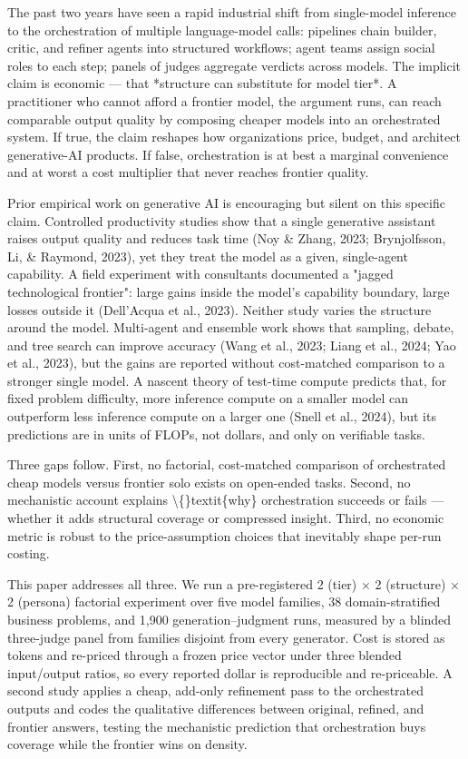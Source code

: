 \documentclass[11pt,a4paper]{article}
\begin{document}
The past two years have seen a rapid industrial shift from single-model
inference to the orchestration of multiple language-model calls: pipelines
chain builder, critic, and refiner agents into structured workflows; agent
teams assign social roles to each step; panels of judges aggregate verdicts
across models. The implicit claim is economic — that *structure can
substitute for model tier*. A practitioner who cannot afford a frontier
model, the argument runs, can reach comparable output quality by composing
cheaper models into an orchestrated system. If true, the claim reshapes how
organizations price, budget, and architect generative-AI products. If
false, orchestration is at best a marginal convenience and at worst a cost
multiplier that never reaches frontier quality.

Prior empirical work on generative AI is encouraging but silent on this
specific claim. Controlled productivity studies show that a single generative
assistant raises output quality and reduces task time (Noy \& Zhang, 2023;
Brynjolfsson, Li, \& Raymond, 2023), yet they treat the model as a given,
single-agent capability. A field experiment with consultants documented a
"jagged technological frontier": large gains inside the model's capability
boundary, large losses outside it (Dell'Acqua et al., 2023). Neither study
varies the structure around the model. Multi-agent and ensemble work shows
that sampling, debate, and tree search can improve accuracy (Wang et al.,
2023; Liang et al., 2024; Yao et al., 2023), but the gains are reported
without cost-matched comparison to a stronger single model. A nascent
theory of test-time compute predicts that, for fixed problem difficulty,
more inference compute on a smaller model can outperform less inference
compute on a larger one (Snell et al., 2024), but its predictions are in
units of FLOPs, not dollars, and only on verifiable tasks.

Three gaps follow. First, no factorial, cost-matched comparison of
orchestrated cheap models versus frontier solo exists on open-ended
tasks. Second, no mechanistic account explains \textbackslash\{\}textit\{why\} orchestration succeeds
or fails — whether it adds structural coverage or compressed insight.
Third, no economic metric is robust to the price-assumption choices that
inevitably shape per-run costing.

This paper addresses all three. We run a pre-registered 2 (tier) ×
2 (structure) × 2 (persona) factorial experiment over five model families,
38 domain-stratified business problems, and 1,900 generation–judgment
runs, measured by a blinded three-judge panel from families disjoint
from every generator. Cost is stored as tokens and re-priced through a
frozen price vector under three blended input/output ratios, so every
reported dollar is reproducible and re-priceable. A second study applies
a cheap, add-only refinement pass to the orchestrated outputs and codes
the qualitative differences between original, refined, and frontier
answers, testing the mechanistic prediction that orchestration buys
coverage while the frontier wins on density.
\end{document}
